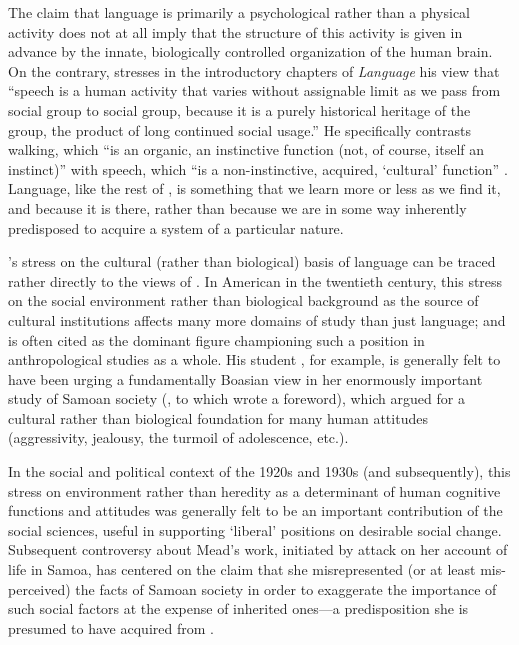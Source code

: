 The claim that language is primarily a psychological rather than a
physical activity does not at all imply that the structure of this
activity is given in advance by the innate, biologically controlled
organization of the human brain. On the contrary, {\Sapir} stresses in
the introductory chapters of \textsl{Language} his view that ``speech
is a human activity that varies without assignable limit as we pass
from social group to social group, because it is a purely historical
heritage of the group, the product of long continued social usage.'' He
specifically contrasts walking, which ``is an organic, an instinctive
function (not, of course, itself an instinct)'' with speech, which ``is
a non-instinctive, acquired, `cultural' function''
\citep[4]{sapir21:language}. Language, like the rest of , is
something that we learn more or less as we find it, and because it is
there, rather than because we are in some way inherently predisposed
to acquire a system of a particular nature.

{\Sapir}'s {stress} on the cultural (rather than biological) basis of
language can be traced rather directly to the views of {\Boas}. In
American  in the twentieth century, this {stress} on the
social environment rather than biological background as the source of
cultural institutions affects many more domains of study than just
language; and {\Boas} is often cited as the dominant figure championing
such a position in anthropological studies as a whole. His student
, for example, is generally felt to have been urging a
fundamentally Boasian view in her enormously important study of {Samoan}
society (\citealt{mead28:samoa}, to which {\Boas} wrote a foreword),
which argued for a cultural rather than biological foundation for many
human attitudes (aggressivity, jealousy, the turmoil of adolescence,
etc.).

In the social and political context of the 1920s and 1930s (and
subsequently), this {stress} on environment rather than heredity as a
determinant of human cognitive functions and attitudes was generally
felt to be an important contribution of the social sciences, useful in
supporting `liberal' positions on desirable social {change}. Subsequent
controversy about Mead's work, initiated by
 attack on her account of life in
Samoa, has centered on the claim that she misrepresented (or at least
mis-perceived) the facts of {Samoan} society in order to exaggerate the
importance of such social factors at the expense of inherited ones—a
predisposition she is presumed to have acquired from {\Boas}.

